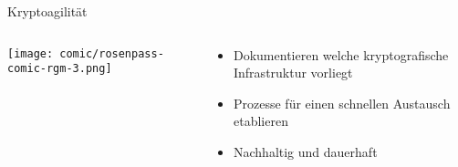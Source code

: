 
\begin{frame}[T]{Kryptoagilität}
  \begin{columns}[T,fullwidth]
    \hfill
    \begin{column}{.30\linewidth}
      \texttt{[image: comic/rosenpass-comic-rgm-3.png]}
    \end{column}
    \begin{column}{.65\linewidth}
      \vspace{5em}
      \begin{itemize}
        \item Dokumentieren welche kryptografische Infrastruktur vorliegt
        \vspace{1.2em}
        \item Prozesse für einen schnellen Austausch etablieren
        \vspace{1.2em}
        \item Nachhaltig und dauerhaft
      \end{itemize}
    \end{column}
    \hfill
  \end{columns}
\end{frame}
